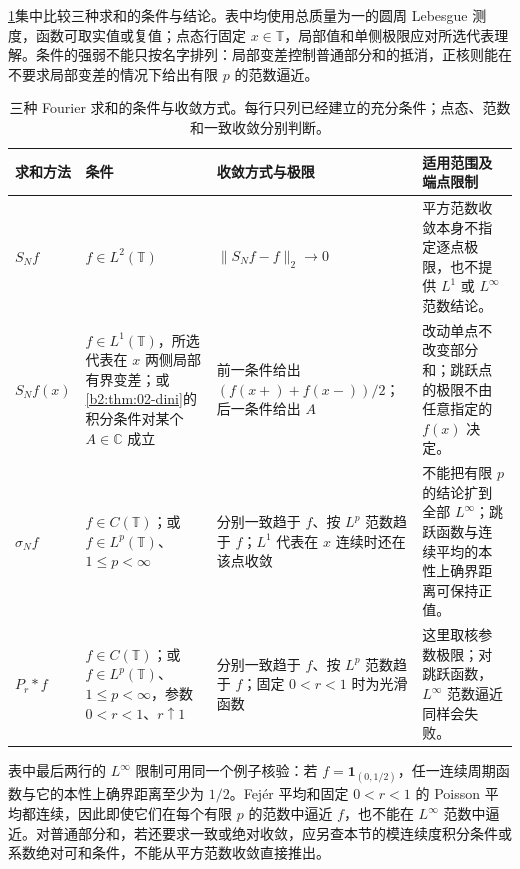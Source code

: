 \ProseParagraphBreak

\cref{b2:tab:02-summation-convergence}集中比较三种求和的条件与结论。表中均使用总质量为一的圆周 Lebesgue 测度，函数可取实值或复值；点态行固定 \(x\in\mathbb T\)，局部值和单侧极限应对所选代表理解。条件的强弱不能只按名字排列：局部变差控制普通部分和的抵消，正核则能在不要求局部变差的情况下给出有限 \(p\) 的范数逼近。

\begin{table}[htbp]
\centering
\caption[三种 Fourier 求和的条件与收敛方式]{三种 Fourier 求和的条件与收敛方式。每行只列已经建立的充分条件；点态、范数和一致收敛分别判断。}
\label{b2:tab:02-summation-convergence}
\begin{tabularx}{\textwidth}{@{}p{}p{}p{}>{\raggedright\arraybackslash}X@{}}
\toprule
求和方法 & 条件 & 收敛方式与极限 & 适用范围及端点限制 \\
\midrule
\(S_Nf\) & \(f\in L^2(\mathbb T)\) & \(\|S_Nf-f\|_2\to0\) & 平方范数收敛本身不指定逐点极限，也不提供 \(L^1\) 或 \(L^\infty\) 范数结论。 \\
\addlinespace
\(S_Nf(x)\) & \(f\in L^1(\mathbb T)\)，所选代表在 \(x\) 两侧局部有界变差；或\cref{b2:thm:02-dini}的积分条件对某个 \(A\in\mathbb C\) 成立 & 前一条件给出 \((f(x+)+f(x-))/2\)；后一条件给出 \(A\) & 改动单点不改变部分和；跳跃点的极限不由任意指定的 \(f(x)\) 决定。 \\
\addlinespace
\(\sigma_Nf\) & \(f\in C(\mathbb T)\)；或 \(f\in L^p(\mathbb T)\)、\(1\leq p<\infty\) & 分别一致趋于 \(f\)、按 \(L^p\) 范数趋于 \(f\)；\(L^1\) 代表在 \(x\) 连续时还在该点收敛 & 不能把有限 \(p\) 的结论扩到全部 \(L^\infty\)；跳跃函数与连续平均的本性上确界距离可保持正值。 \\
\addlinespace
\(P_r*f\) & \(f\in C(\mathbb T)\)；或 \(f\in L^p(\mathbb T)\)、\(1\leq p<\infty\)，参数 \(0<r<1\)、\(r\uparrow1\) & 分别一致趋于 \(f\)、按 \(L^p\) 范数趋于 \(f\)；固定 \(0<r<1\) 时为光滑函数 & 这里取核参数极限；对跳跃函数，\(L^\infty\) 范数逼近同样会失败。 \\
\bottomrule
\end{tabularx}
\end{table}

表中最后两行的 \(L^\infty\) 限制可用同一个例子核验：若 \(f=\mathbf1_{(0,1/2)}\)，任一连续周期函数与它的本性上确界距离至少为 \(1/2\)。Fejér 平均和固定 \(0<r<1\) 的 Poisson 平均都连续，因此即使它们在每个有限 \(p\) 的范数中逼近 \(f\)，也不能在 \(L^\infty\) 范数中逼近。对普通部分和，若还要求一致或绝对收敛，应另查本节的模连续度积分条件或系数绝对可和条件，不能从平方范数收敛直接推出。
